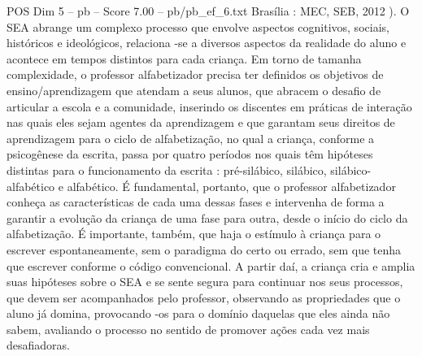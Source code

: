\begin{textsample}{POS Dim 5 – pb – Score 7.00 – pb/pb\_ef\_6.txt}
Brasília : MEC, SEB, 2012 ).
O SEA abrange um complexo processo que envolve aspectos cognitivos, sociais, históricos e ideológicos, relaciona -se a diversos aspectos da realidade do aluno e acontece em tempos distintos para cada criança.
Em torno de tamanha complexidade, o professor alfabetizador precisa ter definidos os objetivos de ensino/aprendizagem que atendam a seus alunos, que abracem o desafio de articular a escola e a comunidade, inserindo os discentes em práticas de interação nas quais eles sejam agentes da aprendizagem e que garantam seus direitos de aprendizagem para o ciclo de alfabetização, no qual a criança, conforme a psicogênese da escrita, passa por quatro períodos nos quais têm hipóteses distintas para o funcionamento da escrita : pré-silábico, silábico, silábico-alfabético e alfabético.
É fundamental, portanto, que o professor alfabetizador conheça as características de cada uma dessas fases e intervenha de forma a garantir a evolução da criança de uma fase para outra, desde o início do ciclo da alfabetização.
É importante, também, que haja o estímulo à criança para o escrever espontaneamente, sem o paradigma do certo ou errado, sem que tenha que escrever conforme o código convencional.
A partir daí, a criança cria e amplia suas hipóteses sobre o SEA e se sente segura para continuar nos seus processos, que devem ser acompanhados pelo professor, observando as propriedades que o aluno já domina, provocando -os para o domínio daquelas que eles ainda não sabem, avaliando o processo no sentido de promover ações cada vez mais desafiadoras.

\end{textsample}
